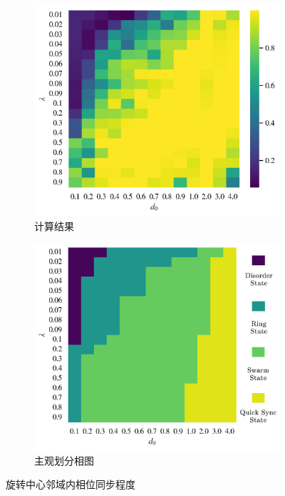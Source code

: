 \documentclass{article}
\begin{document}
\vspace{-0.5cm}
\begin{figure}[H]
	\centering
	\begin{subfigure}[b]{0.49\textwidth}
		\includegraphics[width=\textwidth]{./figs/limitDisPhaseSync.png}
		\vspace{-1cm}
		\caption{计算结果}
	\end{subfigure}
	\begin{subfigure}[b]{0.49\textwidth}
		\includegraphics[width=\textwidth]{./figs/subjectiveOp.png}
		\vspace{-1cm}
		\caption{主观划分相图}
	\end{subfigure}
	\vspace{-0.5cm}
	\caption{旋转中心邻域内相位同步程度}
	\label{fig:fig234c.5.1}
\end{figure}
\end{document}

